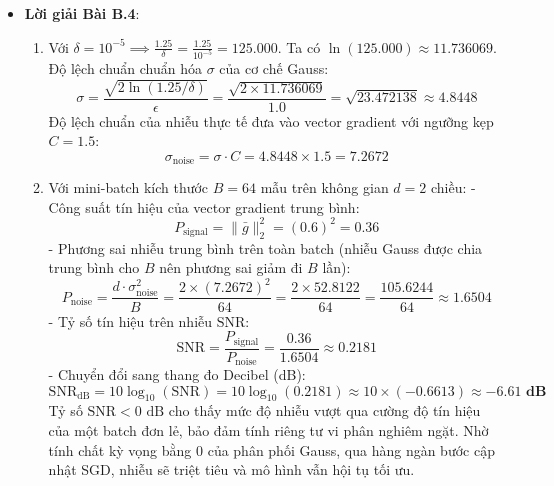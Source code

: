 \begin{itemize}
  \item \textbf{Lời giải Bài B.4}:
  \begin{enumerate}
    \item Với $\delta = 10^{-5} \implies \frac{1.25}{\delta} = \frac{1.25}{10^{-5}} = 125.000$.
    Ta có $\ln(125.000) \approx 11.736069$.
    Độ lệch chuẩn chuẩn hóa $\sigma$ của cơ chế Gauss:
    \begin{equation*}
    \sigma = \frac{\sqrt{2 \ln(1.25 / \delta)}}{\epsilon} = \frac{\sqrt{2 \times 11.736069}}{1.0} = \sqrt{23.472138} \approx \mathbf{4.8448}
    \end{equation*}
    Độ lệch chuẩn của nhiễu thực tế đưa vào vector gradient với ngưỡng kẹp $C = 1.5$:
    \begin{equation*}
    \sigma_{\text{noise}} = \sigma \cdot C = 4.8448 \times 1.5 = \mathbf{7.2672}
    \end{equation*}
    \item Với mini-batch kích thước $B = 64$ mẫu trên không gian $d = 2$ chiều:
    - Công suất tín hiệu của vector gradient trung bình:
      \begin{equation*}
      P_{\text{signal}} = \|\bar{g}\|_2^2 = (0.6)^2 = \mathbf{0.36}
      \end{equation*}
    - Phương sai nhiễu trung bình trên toàn batch (nhiễu Gauss được chia trung bình cho $B$ nên phương sai giảm đi $B$ lần):
      \begin{equation*}
      P_{\text{noise}} = \frac{d \cdot \sigma_{\text{noise}}^2}{B} = \frac{2 \times (7.2672)^2}{64} = \frac{2 \times 52.8122}{64} = \frac{105.6244}{64} \approx \mathbf{1.6504}
      \end{equation*}
    - Tỷ số tín hiệu trên nhiễu $\text{SNR}$:
      \begin{equation*}
      \text{SNR} = \frac{P_{\text{signal}}}{P_{\text{noise}}} = \frac{0.36}{1.6504} \approx \mathbf{0.2181}
      \end{equation*}
    - Chuyển đổi sang thang đo Decibel (dB):
      \begin{equation*}
      \text{SNR}_{\text{dB}} = 10 \log_{10}(\text{SNR}) = 10 \log_{10}(0.2181) \approx 10 \times (-0.6613) \approx \mathbf{-6.61 \text{ dB}}
      \end{equation*}
    Tỷ số $\text{SNR} < 0\text{ dB}$ cho thấy mức độ nhiễu vượt qua cường độ tín hiệu của một batch đơn lẻ, bảo đảm tính riêng tư vi phân nghiêm ngặt. Nhờ tính chất kỳ vọng bằng 0 của phân phối Gauss, qua hàng ngàn bước cập nhật SGD, nhiễu sẽ triệt tiêu và mô hình vẫn hội tụ tối ưu.
  \end{enumerate}
\end{itemize}

